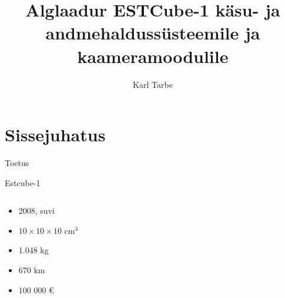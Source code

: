 \documentclass[pdf]{beamer}
\title[Alglaadur ESTCube-1 kahele moodulile]{Alglaadur ESTCube-1 käsu- ja andmehaldussüsteemile ja kaameramoodulile}
\author{Karl Tarbe}
\begin{document}
\begin{frame}[plain]
	\titlepage
\end{frame}

\section{Sissejuhatus}
\begin{frame}{Toetus}
\end{frame}
\begin{frame}{Estcube-1}
	\begin{columns}
		\begin{column}{0.5\textwidth}
			\begin{itemize}
				\item 2008, suvi
				\item \(10 \times 10 \times 10\) cm\({}^3\)
				\item 1.048 kg
				\item 670 km
				\item 100 000 \euro
			\end{itemize}
		\end{column}
		\begin{column}{0.5\textwidth}
		\end{column}
	\end{columns}
\end{frame}
\end{document}

